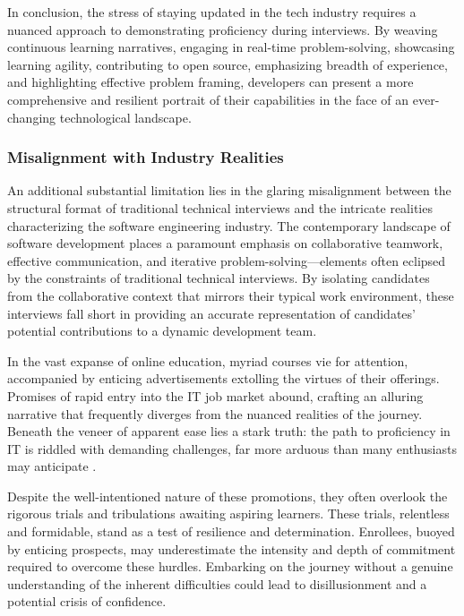 \documentclass[
    a4paper, %
    10pt, %
    unnumberedsections, %
    twoside, %
]{LTJournalArticle}
\begin{document}
In conclusion, the stress of staying updated in the tech industry requires a nuanced approach to demonstrating proficiency during interviews. By weaving continuous learning narratives, engaging in real-time problem-solving, showcasing learning agility, contributing to open source, emphasizing breadth of experience, and highlighting effective problem framing, developers can present a more comprehensive and resilient portrait of their capabilities in the face of an ever-changing technological landscape.





\subsubsection*{Misalignment with Industry Realities}


An additional substantial limitation lies in the glaring misalignment between the structural format of traditional technical interviews and the intricate realities characterizing the software engineering industry. The contemporary landscape of software development places a paramount emphasis on collaborative teamwork, effective communication, and iterative problem-solving—elements often eclipsed by the constraints of traditional technical interviews. By isolating candidates from the collaborative context that mirrors their typical work environment, these interviews fall short in providing an accurate representation of candidates' potential contributions to a dynamic development team.

In the vast expanse of online education, myriad courses vie for attention, accompanied by enticing advertisements extolling the virtues of their offerings. Promises of rapid entry into the IT job market abound, crafting an alluring narrative that frequently diverges from the nuanced realities of the journey. Beneath the veneer of apparent ease lies a stark truth: the path to proficiency in IT is riddled with demanding challenges, far more arduous than many enthusiasts may anticipate \cite{dweck2006mindset,duckworth2016grit}.

Despite the well-intentioned nature of these promotions, they often overlook the rigorous trials and tribulations awaiting aspiring learners. These trials, relentless and formidable, stand as a test of resilience and determination. Enrollees, buoyed by enticing prospects, may underestimate the intensity and depth of commitment required to overcome these hurdles. Embarking on the journey without a genuine understanding of the inherent difficulties could lead to disillusionment and a potential crisis of confidence.
\end{document}
